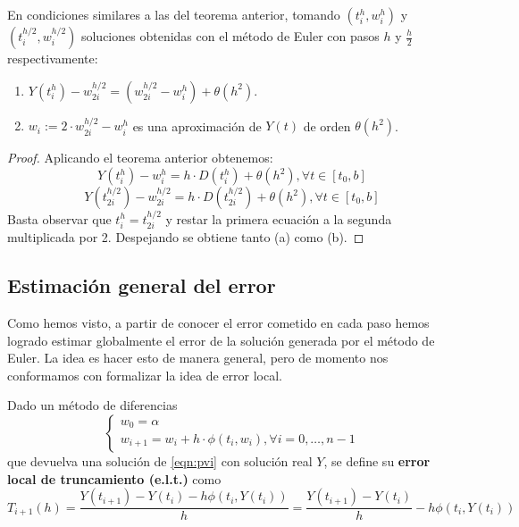 \begin{theorem}
    En condiciones similares a las del teorema anterior, tomando $(t_i^h,w_i^h)$ y $(t_i^{h/2},w_i^{h/2})$ soluciones obtenidas con el método de Euler con pasos $h$ y $\frac{h}{2}$ respectivamente:
    \begin{enumerate}[label=(\alph*)]
        \item $Y(t_i^h)-w_{2i}^{h/2} = (w_{2i}^{h/2}-w_i^h) + \theta(h^2)$.
        \item $w_i := 2\cdot w_{2i}^{h/2}-w_i^h$ es una aproximación de $Y(t)$ de orden $\theta(h^2)$.
    \end{enumerate}
\end{theorem}

\begin{proof}
    Aplicando el teorema anterior obtenemos:
    $$
    Y(t_i^h)-w_i^h=h\cdot D(t_i^h)+\theta(h^2),\forall t\in[t_0,b]
    $$
    $$
    Y(t_{2i}^{h/2})-w_{2i}^{h/2}=h\cdot D(t_{2i}^{h/2})+\theta(h^2),\forall t\in[t_0,b]
    $$
    Basta observar que $t_i^h = t_{2i}^{h/2}$ y restar la primera ecuación a la segunda multiplicada por 2. Despejando se obtiene tanto (a) como (b).

\end{proof}

\subsection{Estimación general del error}

Como hemos visto, a partir de conocer el error cometido en cada paso hemos logrado estimar globalmente el error de la solución generada por el método de Euler. La idea es hacer esto de manera general, pero de momento nos conformamos con formalizar la idea de error local.

\begin{definition}
Dado un método de diferencias
\begin{equation} \label{eqn:diffmet}
\begin{cases}
    w_0=\alpha \\
    w_{i+1}=w_i + h\cdot \phi(t_i, w_i), \forall i=0,\dots, n-1
\end{cases}
\end{equation}
    que devuelva una solución de \ref{eqn:pvi} con solución real $Y$, se define su \textbf{error local de truncamiento (e.l.t.)} como
    $$
    T_{i+1}(h) = \frac{Y(t_{i+1})-Y(t_i)-h\phi(t_i,Y(t_i))}{h}
    = \frac{Y(t_{i+1})-Y(t_i)}{h} -h\phi(t_i,Y(t_i))
    $$
\end{definition}


